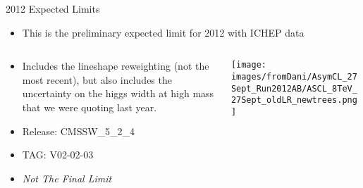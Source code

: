 \documentclass{beamer}
\begin{document}
\begin{frame}{2012 Expected Limits}

  \begin{itemize}
  \item
    This is the preliminary expected limit for 2012 with ICHEP data%
\end{itemize}
\begin{columns}
    \begin{column}{0.5\textwidth}
\begin{itemize}
  \item
    Includes the lineshape reweighting (not the most recent), but also includes the uncertainty on the higgs width at high mass that we were quoting last year.
  \item
    Release: CMSSW\_5\_2\_4
  \item
    TAG: V02-02-03
\item
  \emph{\color{red} Not The Final Limit}
  \end{itemize}
  \end{column}
\begin{column}{0.5\textwidth}
  \begin{center}
    \texttt{[image: images/fromDani/AsymCL\_27Sept\_Run2012AB/ASCL\_8TeV\_27Sept\_oldLR\_newtrees.png]}
  \end{center}

\end{column}
  \end{columns}

\end{frame}


\end{document}
